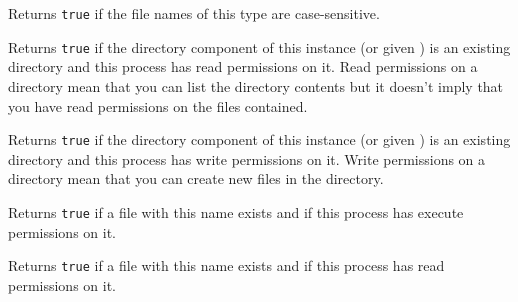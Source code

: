 
Returns {\tt true} if the file names of this type are case-sensitive.


\label{wxfilenameisdirreadable}



Returns {\tt true} if the directory component of this instance (or given )
is an existing directory and this process has read permissions on it.
Read permissions on a directory mean that you can list the directory contents but it
doesn't imply that you have read permissions on the files contained.


\label{wxfilenameisdirwritable}



Returns {\tt true} if the directory component of this instance (or given )
is an existing directory and this process has write permissions on it.
Write permissions on a directory mean that you can create new files in the directory.


\label{wxfilenameisfileexecutable}



Returns {\tt true} if a file with this name exists and if this process has execute permissions on it.


\label{wxfilenameisfilereadable}



Returns {\tt true} if a file with this name exists and if this process has read permissions on it.


\label{wxfilenameisfilewritable}



